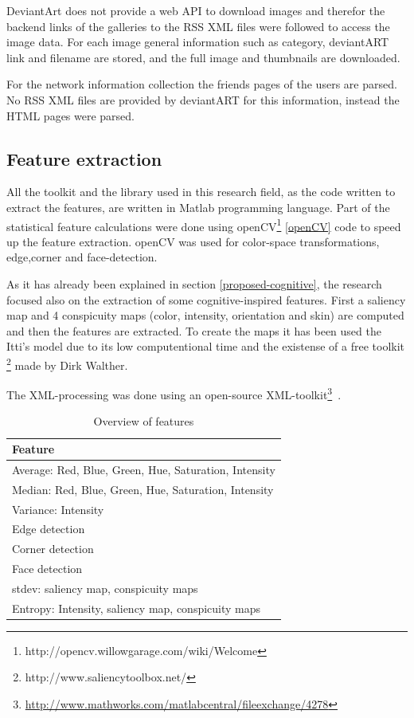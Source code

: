 DeviantArt does not provide a web API to download images and therefor the backend links of the galleries to the RSS XML files were followed to access
the image data. For each image general information such as category, deviantART link and filename are stored, and the full image and 
thumbnails are downloaded.

For the network information collection the friends pages 
of the users are parsed. No RSS XML files are provided by deviantART for this
information, instead the HTML pages were parsed.


\subsection{Feature extraction}
All the toolkit and the library used in this research field, as the code written to extract the features, are written in Matlab programming language.
Part of the statistical feature calculations were done using openCV\footnote{http://opencv.willowgarage.com/wiki/Welcome} \ref{openCV} code to speed up the feature extraction. openCV was used for color-space transformations, edge,corner and face-detection.

As it has already been explained in section \ref{proposed-cognitive}, the research focused also on the extraction of some cognitive-inspired features. First a saliency map and 4 conspicuity maps (color, intensity, orientation and skin) are computed and then the features are extracted. To create the maps it has been used the Itti's model \cite{Itti_model} due to its low computentional time and the existense of a free toolkit \footnote{http://www.saliencytoolbox.net/} made by Dirk Walther. 

The XML-processing was done using an open-source XML-toolkit\footnote{\url{http://www.mathworks.com/matlabcentral/fileexchange/4278}}~\cite{geusebroek2005six}.

\begin{table}[htb]
    \centering
    \begin{tabular}	{ | l | } 
		\hline
		Feature \\
		\hline
		Average: Red, Blue, Green, Hue, Saturation, Intensity \\
		Median: Red, Blue, Green, Hue, Saturation, Intensity \\
		Variance: Intensity \\
		Edge detection \\
		Corner detection \\
		Face detection \\
		stdev: saliency map, conspicuity maps \\
		Entropy: Intensity, saliency map, conspicuity maps \\
		\hline
    \end{tabular}
    \caption{Overview of features}
    \label{tab:featurelist}
\end{table}

